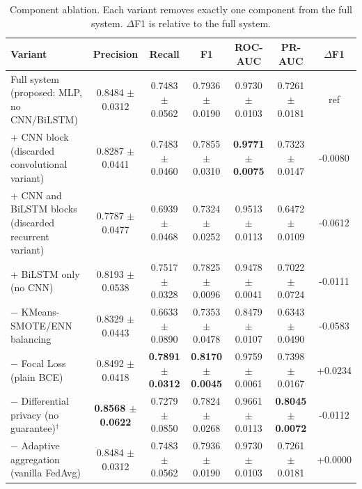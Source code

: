 \begin{table}[htbp]
\centering
\caption{Component ablation. Each variant removes exactly one component from the full system. $\Delta$F1 is relative to the full system.}
\label{tab:ablation}
\begin{tabular}{lcccccc}
\toprule
Variant & Precision & Recall & F1 & ROC-AUC & PR-AUC & $\Delta$F1 \\
\midrule
Full system (proposed: MLP, no CNN/BiLSTM) & 0.8484 $\pm$ 0.0312 & 0.7483 $\pm$ 0.0562 & 0.7936 $\pm$ 0.0190 & 0.9730 $\pm$ 0.0103 & 0.7261 $\pm$ 0.0181 & ref \\
+ CNN block (discarded convolutional variant) & 0.8287 $\pm$ 0.0441 & 0.7483 $\pm$ 0.0460 & 0.7855 $\pm$ 0.0310 & \textbf{0.9771 $\pm$ 0.0075} & 0.7323 $\pm$ 0.0147 & -0.0080 \\
+ CNN and BiLSTM blocks (discarded recurrent variant) & 0.7787 $\pm$ 0.0477 & 0.6939 $\pm$ 0.0468 & 0.7324 $\pm$ 0.0252 & 0.9513 $\pm$ 0.0113 & 0.6472 $\pm$ 0.0109 & -0.0612 \\
+ BiLSTM only (no CNN) & 0.8193 $\pm$ 0.0538 & 0.7517 $\pm$ 0.0328 & 0.7825 $\pm$ 0.0096 & 0.9478 $\pm$ 0.0041 & 0.7022 $\pm$ 0.0724 & -0.0111 \\
− KMeans-SMOTE/ENN balancing & 0.8329 $\pm$ 0.0443 & 0.6633 $\pm$ 0.0890 & 0.7353 $\pm$ 0.0478 & 0.8479 $\pm$ 0.0107 & 0.6343 $\pm$ 0.0490 & -0.0583 \\
− Focal Loss (plain BCE) & 0.8492 $\pm$ 0.0418 & \textbf{0.7891 $\pm$ 0.0312} & \textbf{0.8170 $\pm$ 0.0045} & 0.9759 $\pm$ 0.0061 & 0.7398 $\pm$ 0.0167 & +0.0234 \\
− Differential privacy (no guarantee)$^{\dagger}$ & \textbf{0.8568 $\pm$ 0.0622} & 0.7279 $\pm$ 0.0850 & 0.7824 $\pm$ 0.0268 & 0.9661 $\pm$ 0.0113 & \textbf{0.8045 $\pm$ 0.0072} & -0.0112 \\
− Adaptive aggregation (vanilla FedAvg) & 0.8484 $\pm$ 0.0312 & 0.7483 $\pm$ 0.0562 & 0.7936 $\pm$ 0.0190 & 0.9730 $\pm$ 0.0103 & 0.7261 $\pm$ 0.0181 & +0.0000 \\
\bottomrule
\end{tabular}
\end{table}